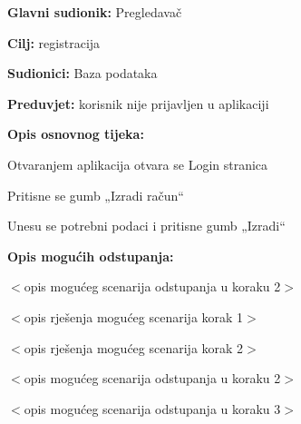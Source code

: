 	\noindent {}
\begin{packed_item}
	
	\item \textbf{Glavni sudionik: }Pregledavač
	\item  \textbf{Cilj:} registracija
	\item  \textbf{Sudionici:}
	Baza podataka
	\item  \textbf{Preduvjet:} korisnik nije prijavljen u aplikaciji
	\item  \textbf{Opis osnovnog tijeka:}
	
	\item[] \begin{packed_enum}
		
		\item	Otvaranjem aplikacija otvara se Login stranica
		\item	Pritisne se gumb „Izradi račun“
		\item	Unesu se potrebni podaci i pritisne gumb „Izradi“
		
	\end{packed_enum}
	
	\item  \textbf{Opis mogućih odstupanja:}
	
	\item[] \begin{packed_item}
		
		\item[2.a] $<$opis mogućeg scenarija odstupanja u koraku 2$>$
		\item[] \begin{packed_enum}
			
			\item $<$opis rješenja mogućeg scenarija korak 1$>$
			\item $<$opis rješenja mogućeg scenarija korak 2$>$
			
		\end{packed_enum}
		\item[2.b] $<$opis mogućeg scenarija odstupanja u koraku 2$>$
		\item[3.a] $<$opis mogućeg scenarija odstupanja  u koraku 3$>$
		
	\end{packed_item}
\end{packed_item}

